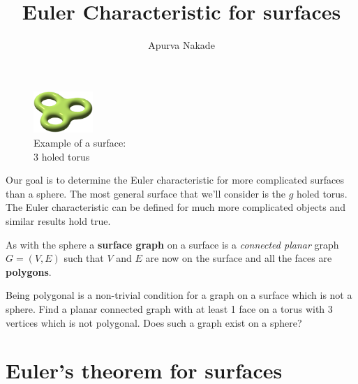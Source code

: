 
\usepackage{wrapfig}
\usepackage{caption}
\usepackage{csquotes}
\usepackage{mdframed}

\renewcommand{\thefootnote}{\fnsymbol{footnote}}


\title{Euler Characteristic for surfaces}
\author{Apurva Nakade}
\maketitle






\begin{figure}
	\begin{center}
		\includegraphics[width=0.20\textwidth]{images/3_holed_torus}
	\end{center}
	\captionsetup{labelformat=empty}
	\caption{Example of a surface: \\3 holed torus}
\end{figure}
Our goal is to determine the Euler characteristic for more complicated surfaces than a sphere. The most general surface that we'll consider is the $g$ holed torus. The Euler characteristic can be defined for much more complicated objects and similar results hold true.

As with the sphere a \textbf{surface graph} on a surface is a \emph{connected planar} graph $ G = (V,E) $ such that $ V $ and $ E $ are now on the surface and all the faces are \textbf{polygons}.

\begin{exercise}\label{JordanCurve}
	Being polygonal is a non-trivial condition for a graph on a surface which is not a sphere. Find a planar connected graph with at least 1 face on a torus with 3 vertices which is not polygonal. Does such a graph exist on a sphere?
\end{exercise}


\section{Euler's theorem for surfaces}


